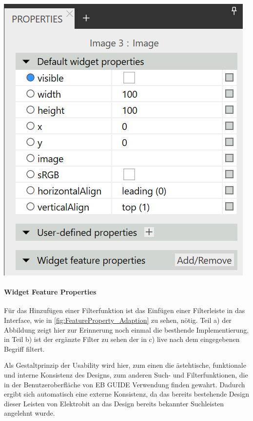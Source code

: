 \begin{center}
  \includegraphics[scale=0.8]{figures/TemplateProperties_Adaption.png}
  \label{fig:TemplateProperties_Adaption}
\end{center}


\paragraph{Widget Feature Properties}
Für das Hinzufügen einer Filterfunktion ist das Einfügen einer Filterleiste in das Interface, wie in \cref{fig:FeatureProperty_Adaption} zu sehen, nötig.
Teil a) der Abbildung zeigt hier zur Erinnerung noch einmal die besthende Implementierung, in Teil b) ist der ergänzte Filter zu sehen der in c) live nach dem eingegebenen Begriff filtert.

Als Gestaltprinzip der Usability wird hier, zum einen die ästehtische, funktionale und interne Konsistenz des Designs, zum anderen Such- und Filterfunktionen, die in der Benutzeroberfläche von EB GUIDE Verwendung finden gewahrt.
Dadurch ergibt sich automatisch eine externe Konsistenz, da das bereits bestehende Design dieser Leisten von Elektrobit an das Design bereits bekannter Suchleisten angelehnt wurde.

